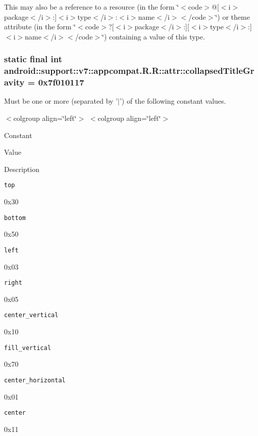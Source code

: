 This may also be a reference to a resource (in the form \char`\"{}$<$code$>$@\mbox{[}$<$i$>$package$<$/i$>$:\mbox{]}$<$i$>$type$<$/i$>$:$<$i$>$name$<$/i$>$$<$/code$>$\char`\"{}) or theme attribute (in the form \char`\"{}$<$code$>$?\mbox{[}$<$i$>$package$<$/i$>$:\mbox{]}\mbox{[}$<$i$>$type$<$/i$>$:\mbox{]}$<$i$>$name$<$/i$>$$<$/code$>$\char`\"{}) containing a value of this type. \hypertarget{classandroid_1_1support_1_1v7_1_1appcompat_1_1_r_1_1attr_e73f48a452f14d6a31f321acdb48d839}{
\subsubsection[{collapsedTitleGravity}]{\setlength{\rightskip}{0pt plus 5cm}static final int android::support::v7::appcompat.R.R::attr::collapsedTitleGravity = 0x7f010117}}
\label{classandroid_1_1support_1_1v7_1_1appcompat_1_1_r_1_1attr_e73f48a452f14d6a31f321acdb48d839}


Must be one or more (separated by '$|$') of the following constant values. \begin{TabularC}{0}
\hline
\end{TabularC}
$<$colgroup align=\char`\"{}left\char`\"{}$>$ $<$colgroup align=\char`\"{}left\char`\"{}$>$ 

Constant

Value

Description 

{\tt top}

0x30

{\tt bottom}

0x50

{\tt left}

0x03

{\tt right}

0x05

{\tt center\_\-vertical}

0x10

{\tt fill\_\-vertical}

0x70

{\tt center\_\-horizontal}

0x01

{\tt center}

0x11

